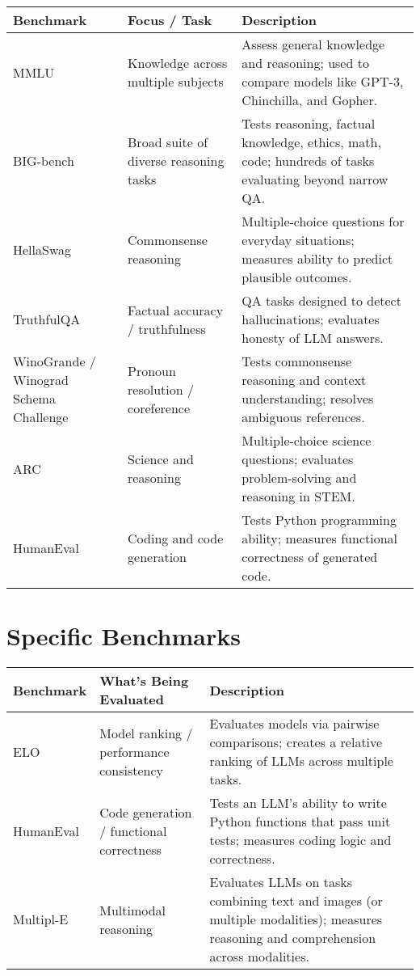 \documentclass[a4paper, 12pt]{article}
\begin{document}
\begin{tabularx}{\textwidth}{|>{\hsize=0.2\hsize}X|>{\hsize=0.3\hsize}X|>{\hsize=0.5\hsize}X|}
\hline
\textbf{Benchmark} & \textbf{Focus / Task} & \textbf{Description} \\
\hline
MMLU & Knowledge across multiple subjects & Assess general knowledge and reasoning; used to compare models like GPT-3, Chinchilla, and Gopher. \\
\hline
BIG-bench & Broad suite of diverse reasoning tasks & Tests reasoning, factual knowledge, ethics, math, code; hundreds of tasks evaluating beyond narrow QA. \\
\hline
HellaSwag & Commonsense reasoning & Multiple-choice questions for everyday situations; measures ability to predict plausible outcomes. \\
\hline
TruthfulQA & Factual accuracy / truthfulness & QA tasks designed to detect hallucinations; evaluates honesty of LLM answers. \\
\hline
WinoGrande / Winograd Schema Challenge & Pronoun resolution / coreference & Tests commonsense reasoning and context understanding; resolves ambiguous references. \\
\hline
ARC & Science and reasoning & Multiple-choice science questions; evaluates problem-solving and reasoning in STEM. \\
\hline
HumanEval & Coding and code generation & Tests Python programming ability; measures functional correctness of generated code. \\
\hline
\end{tabularx}

\vspace{1em}

\section*{Specific Benchmarks}

\begin{tabularx}{\textwidth}{|>{\hsize=0.2\hsize}X|>{\hsize=0.3\hsize}X|>{\hsize=0.5\hsize}X|}
\hline
\textbf{Benchmark} & \textbf{What’s Being Evaluated} & \textbf{Description} \\
\hline
ELO & Model ranking / performance consistency & Evaluates models via pairwise comparisons; creates a relative ranking of LLMs across multiple tasks. \\
\hline
HumanEval & Code generation / functional correctness & Tests an LLM’s ability to write Python functions that pass unit tests; measures coding logic and correctness. \\
\hline
Multipl-E & Multimodal reasoning & Evaluates LLMs on tasks combining text and images (or multiple modalities); measures reasoning and comprehension across modalities. \\
\hline
\end{tabularx}
\end{document}
